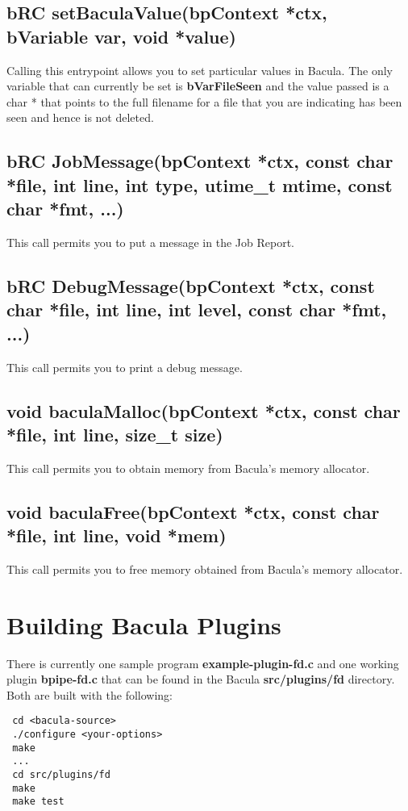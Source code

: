 \subsection{bRC setBaculaValue(bpContext *ctx, bVariable var, void *value)}
Calling this entrypoint allows you to set particular values in
Bacula. The only variable that can currently be set is 
{\bf bVarFileSeen} and the value passed is a char * that points
to the full filename for a file that you are indicating has been
seen and hence is not deleted.

\subsection{bRC JobMessage(bpContext *ctx, const char *file, int line,
       int type, utime\_t mtime, const char *fmt, ...)}
This call permits you to put a message in the Job Report.


\subsection{bRC DebugMessage(bpContext *ctx, const char *file, int line,
       int level, const char *fmt, ...)}
This call permits you to print a debug message.


\subsection{void baculaMalloc(bpContext *ctx, const char *file, int line,
       size\_t size)}
This call permits you to obtain memory from Bacula's memory allocator.


\subsection{void baculaFree(bpContext *ctx, const char *file, int line, void *mem)}
This call permits you to free memory obtained from Bacula's memory allocator.

\section{Building Bacula Plugins}
There is currently one sample program {\bf example-plugin-fd.c} and
one working plugin {\bf bpipe-fd.c} that can be found in the Bacula
{\bf src/plugins/fd} directory.  Both are built with the following:

\begin{verbatim}
 cd <bacula-source>
 ./configure <your-options>
 make
 ...
 cd src/plugins/fd
 make
 make test
\end{verbatim}

